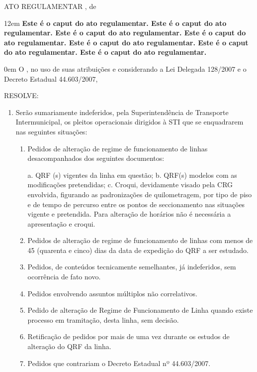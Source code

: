 \documentclass[a4paper,11pt]{report}
\begin{document}

\begin{center}
ATO REGULAMENTAR \NumeroAto, de \DataAssinatura
\end{center}

\leftskip12em
\textbf{Este é o caput do ato regulamentar. Este é o caput do ato regulamentar. Este é o caput do ato regulamentar. Este é o caput do ato regulamentar. Este é o caput do ato regulamentar. Este é o caput do ato regulamentar. Este é o caput do ato regulamentar.}

\leftskip0em
O \CargoSignatario, no uso de suas atribuições e considerando a Lei Delegada 128/2007 e o Decreto Estadual 44.603/2007,

RESOLVE:

\begin{enumerate}[label=Art. \arabic*]
\item \label{itm:A5JT} Serão sumariamente indeferidos, pela Superintendência de Transporte Intermunicipal, os pleitos operacionais dirigidos à STI que se enquadrarem nas seguintes situações:

\begin{enumerate}[label=\roman*.]
\item \label{itm:3CK8} Pedidos de alteração de regime de funcionamento de linhas desacompanhados dos seguintes documentos:

a. QRF (s) vigentes da linha em questão;
b. QRF(s) modelos com as modificações pretendidas;
c. Croqui, devidamente visado pela CRG envolvida, figurando as padronizações de quilometragem, por tipo de piso e de tempo de percurso entre os pontos de seccionamento nas situações vigente e pretendida. Para alteração de horários não é necessária a apresentação e croqui.

\item \label{itm:6FZL} Pedidos de alteração de regime de funcionamento de linhas com menos de 45 (quarenta e cinco) dias da data de expedição do QRF a ser estudado.
\item \label{itm:3QJD} Pedidos, de conteúdos tecnicamente semelhantes, já indeferidos, sem ocorrência de fato novo.
\item \label{itm:WHLA} Pedidos envolvendo assuntos múltiplos não correlativos.
\item \label{itm:6WF3} Pedido de alteração de Regime de Funcionamento de Linha quando existe processo em tramitação, desta linha, sem decisão.
\item \label{itm:EUAC} Retificação de pedidos por mais de uma vez durante os estudos de alteração do QRF da linha.
\item \label{itm:NFZG} Pedidos que contrariam o Decreto Estadual nº 44.603/2007.
\end{enumerate}


\end{enumerate}
\end{document}
